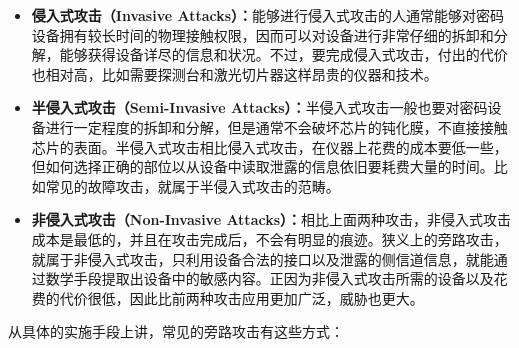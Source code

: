 \begin{itemize}
\item \textbf{侵入式攻击（Invasive Attacks）：}能够进行侵入式攻击的人通常能够对密码设备拥有较长时间的物理接触权限，因而可以对设备进行非常仔细的拆卸和分解，能够获得设备详尽的信息和状况。不过，要完成侵入式攻击，付出的代价也相对高，比如需要探测台和激光切片器这样昂贵的仪器和技术。

\item \textbf{半侵入式攻击（Semi-Invasive Attacks）：}半侵入式攻击一般也要对密码设备进行一定程度的拆卸和分解，但是通常不会破坏芯片的钝化膜，不直接接触芯片的表面。半侵入式攻击相比侵入式攻击，在仪器上花费的成本要低一些，但如何选择正确的部位以从设备中读取泄露的信息依旧要耗费大量的时间。比如常见的故障攻击，就属于半侵入式攻击的范畴。

\item \textbf{非侵入式攻击（Non-Invasive Attacks）：}相比上面两种攻击，非侵入式攻击成本是最低的，并且在攻击完成后，不会有明显的痕迹。狭义上的旁路攻击，就属于非侵入式攻击，只利用设备合法的接口以及泄露的侧信道信息，就能通过数学手段提取出设备中的敏感内容。正因为非侵入式攻击所需的设备以及花费的代价很低，因此比前两种攻击应用更加广泛，威胁也更大。
\end{itemize}

\vspace*{\baselineskip}

从具体的实施手段上讲，常见的旁路攻击有这些方式： \cite{sca_ten_year}

